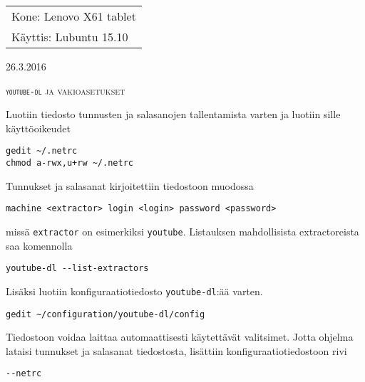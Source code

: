 \documentclass[main.tex]{subfiles}
\begin{document}
\thispagestyle{empty}
\begin{tabular}[t]{l}
Kone: Lenovo X61 tablet\\
Käyttis: Lubuntu 15.10
\end{tabular}
\hfill 26.3.2016

{\scshape\Large{\texttt{youtube-dl} ja vakioasetukset}}

Luotiin tiedosto tunnusten ja salasanojen tallentamista varten ja luotiin sille käyttöoikeudet

\begin{lstlisting}
gedit ~/.netrc
chmod a-rwx,u+rw ~/.netrc
\end{lstlisting}

Tunnukset ja salasanat kirjoitettiin tiedostoon muodossa

\begin{lstlisting}
machine <extractor> login <login> password <password>
\end{lstlisting}

missä \texttt{extractor} on esimerkiksi \texttt{youtube}. Listauksen mahdollisista extractoreista saa komennolla

\begin{lstlisting}
youtube-dl --list-extractors
\end{lstlisting}

Lisäksi luotiin konfiguraatiotiedosto \texttt{youtube-dl}:ää varten.

\begin{lstlisting}
gedit ~/configuration/youtube-dl/config
\end{lstlisting}

Tiedostoon voidaa laittaa automaattisesti käytettävät valitsimet. Jotta ohjelma lataisi tunnukset ja salasanat tiedostosta, lisättiin konfiguraatiotiedostoon rivi

\begin{lstlisting}
--netrc
\end{lstlisting}
\end{document}
